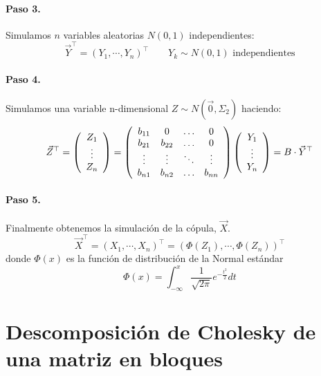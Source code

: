 \paragraph{Paso 3.} Simulamos $n$ variables aleatorias $N(0,1)$ independientes:
\begin{displaymath}
\vec{Y}^{\top}=(Y_1, \cdots, Y_n)^{\top} \qquad Y_k \sim N(0,1) \textrm{ independientes}
\end{displaymath}

\paragraph{Paso 4.} Simulamos una variable n-dimensional $Z \sim N(\vec{0}, \Sigma_2)$
haciendo:
\begin{displaymath}
\vec{Z}^{\top} = 
\left(
\begin{array}{c}
Z_1 \cr
\vdots \cr
Z_n
\end{array}
\right) 
=
\left(
\begin{array}{cccc}
b_{11}   & 0        & \ldots & 0       \cr
b_{21}   & b_{22}   & \ldots & 0       \cr
\vdots  & \vdots  & \ddots & \vdots \cr
b_{n1}   & b_{n2}   & \ldots & b_{nn}
\end{array}
\right)
\left(
\begin{array}{c}
Y_1 \cr
\vdots \cr
Y_n
\end{array}
\right) 
 = B \cdot \vec{Y}^{\top}
\end{displaymath}

\paragraph{Paso 5.} Finalmente obtenemos la simulaci\'on de la c\'opula, $\vec{X}$.
\begin{displaymath}
\vec{X}^{\top} = (X_1, \cdots, X_n)^{\top} = (\Phi(Z_1), \cdots, \Phi(Z_n))^{\top}
\end{displaymath}
donde $\Phi(x)$ es la funci\'on de distribuci\'on de la Normal est\'andar
\begin{displaymath}
\Phi(x) = \int_{-\infty}^{x} \frac{1}{\sqrt{2 \pi}} e^{-\frac{t^2}{2}} dt
\end{displaymath}


\section{Descomposici\'on de Cholesky de una matriz en bloques}

